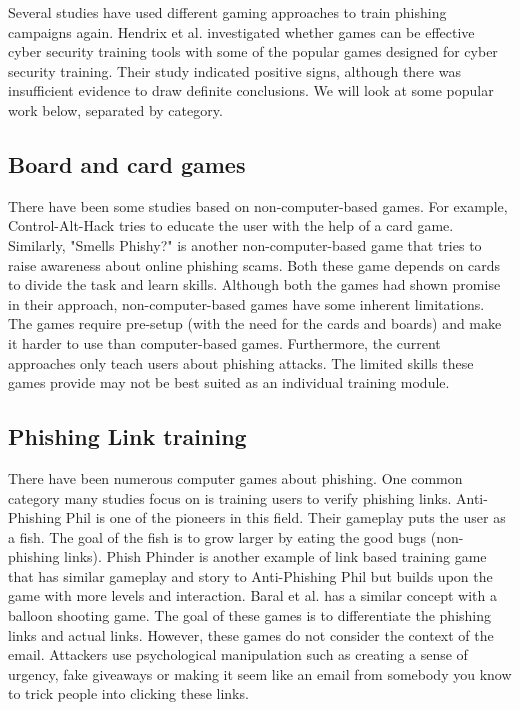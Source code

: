 Several studies have used different gaming approaches to train phishing campaigns again. Hendrix et al. \cite{hendrix_al_sherbaz_bloom_2016} investigated whether games can be effective cyber security training tools with some of the popular games designed for cyber security training. Their study indicated positive signs, although there was insufficient evidence to draw definite conclusions. We will look at some popular work below, separated by category.

\subsection{Board and card games}
There have been some studies based on non-computer-based games. For example, Control-Alt-Hack \cite{control_alt_hack} tries to educate the user with the help of a card game. Similarly, "Smells Phishy?" is another non-computer-based game that tries to raise awareness about online phishing scams. Both these game depends on cards to divide the task and learn skills. Although both the games had shown promise in their approach, non-computer-based games have some inherent limitations. The games require pre-setup (with the need for the cards and boards) and make it harder to use than computer-based games. Furthermore, the current approaches only teach users about phishing attacks. The limited skills these games provide may not be best suited as an individual training module.

\subsection{Phishing Link training}
There have been numerous computer games about phishing. One common category many studies focus on is training users to verify phishing links. Anti-Phishing Phil \cite{anti_phishing_phil} is one of the pioneers in this field. Their gameplay puts the user as a fish. The goal of the fish is to grow larger by eating the good bugs (non-phishing links). Phish Phinder \cite{phish_phinder} is another example of link based training game that has similar gameplay and story to Anti-Phishing Phil but builds upon the game with more levels and interaction. Baral et al. \cite{gamified_appraoch} has a similar concept with a balloon shooting game. The goal of these games is to differentiate the phishing links and actual links. However, these games do not consider the context of the email. Attackers use psychological manipulation such as creating a sense of urgency, fake giveaways or making it seem like an email from somebody you know to trick people into clicking these links.

